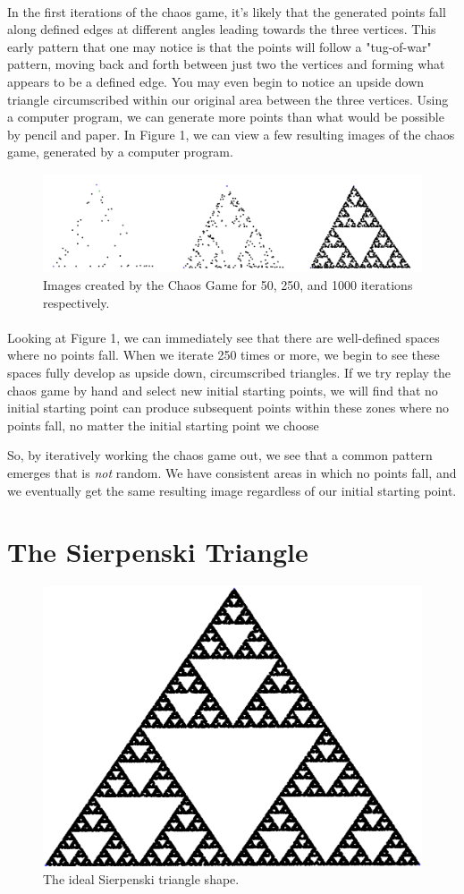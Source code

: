 \documentclass{article}
\begin{document}
\paragraph{}
In the first iterations of the chaos game, it's likely that the generated points fall along defined edges at different angles leading towards the three vertices. This early pattern that one may notice is that the points will follow a "tug-of-war" pattern, moving back and forth between just two the vertices and forming what appears to be a defined edge. You may even begin to notice an upside down triangle circumscribed within our original area between the three vertices. Using a computer program, we can generate more points than what would be possible by pencil and paper. In Figure 1, we can view a few resulting images of the chaos game, generated by a computer program.
\begin{figure}[H]
    \includegraphics[width=\linewidth, height=.2\textheight]{combined_image}
    \caption{Images created by the Chaos Game for 50, 250, and 1000 iterations respectively.}
\end{figure}
\paragraph{}
Looking at Figure 1, we can immediately see that there are well-defined spaces where no points fall. When we iterate 250 times or more, we begin to see these spaces fully develop as upside down, circumscribed triangles. If we try replay the chaos game by hand and select new initial starting points, we will find that no initial starting point can produce subsequent points within these zones where no points fall, no matter the initial starting point we choose

 So, by iteratively working the chaos game out, we see that a common pattern emerges that is \textit{not} random. We have consistent areas in which no points fall, and we eventually get the same resulting image regardless of our initial starting point.
\section*{The Sierpenski Triangle}
\begin{figure}[H]
    \centering
    \includegraphics[width=.5\linewidth, height=.25\textheight]{ideal}
    \caption{The ideal Sierpenski triangle shape.}
\end{figure}
\end{document}
